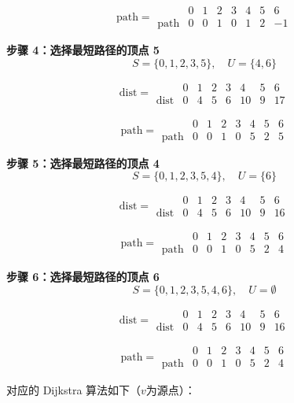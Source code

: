 \documentclass[lang=cn,newtx,10pt,scheme=chinese]{elegantbook}
\begin{document}
\[
\text{path} =
\begin{array}{c|ccccccc}
 & 0 & 1 & 2 & 3 & 4 & 5 & 6 \\ \hline
\text{path} & 0 & 0 & 1 & 0 & 1 & 2 & -1
\end{array}
\]

\textbf{步骤 4：选择最短路径的顶点 5}
\[
S = \{0,1,2,3,5\}, \quad U = \{4, 6\}
\]

\[
\text{dist} =
\begin{array}{c|ccccccc}
 & 0 & 1 & 2 & 3 & 4 & 5 & 6 \\ \hline
\text{dist} & 0 & 4 & 5 & 6 & 10 & 9 & 17
\end{array}
\]

\[
\text{path} =
\begin{array}{c|ccccccc}
 & 0 & 1 & 2 & 3 & 4 & 5 & 6 \\ \hline
\text{path} & 0 & 0 & 1 & 0 & 5 & 2 & 5
\end{array}
\]

\textbf{步骤 5：选择最短路径的顶点 4}
\[
S = \{0,1,2,3,5,4\}, \quad U = \{6\}
\]

\[
\text{dist} =
\begin{array}{c|ccccccc}
 & 0 & 1 & 2 & 3 & 4 & 5 & 6 \\ \hline
\text{dist} & 0 & 4 & 5 & 6 & 10 & 9 & 16
\end{array}
\]

\[
\text{path} =
\begin{array}{c|ccccccc}
 & 0 & 1 & 2 & 3 & 4 & 5 & 6 \\ \hline
\text{path} & 0 & 0 & 1 & 0 & 5 & 2 & 4
\end{array}
\]

\textbf{步骤 6：选择最短路径的顶点 6}
\[
S = \{0,1,2,3,5,4,6\}, \quad U = \emptyset
\]

\[
\text{dist} =
\begin{array}{c|ccccccc}
 & 0 & 1 & 2 & 3 & 4 & 5 & 6 \\ \hline
\text{dist} & 0 & 4 & 5 & 6 & 10 & 9 & 16
\end{array}
\]

\[
\text{path} =
\begin{array}{c|ccccccc}
 & 0 & 1 & 2 & 3 & 4 & 5 & 6 \\ \hline
\text{path} & 0 & 0 & 1 & 0 & 5 & 2 & 4
\end{array}
\]

对应的 Dijkstra 算法如下（$v$为源点）：
\end{document}
